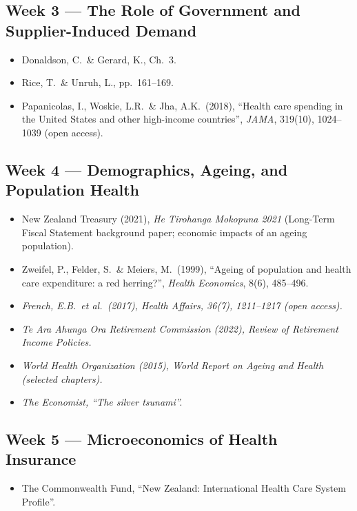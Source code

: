 \documentclass[11pt, a4paper]{article}
\begin{document}
\subsection{Week 3 — The Role of Government and Supplier-Induced Demand}
\begin{itemize}
  \item Donaldson, C.\ \& Gerard, K., Ch.~3.
  \item Rice, T.\ \& Unruh, L., pp.~161--169.
  \item Papanicolas, I., Woskie, L.R.\ \& Jha, A.K.\ (2018), ``Health care spending in the United States and other high-income countries'', \textit{JAMA}, 319(10), 1024--1039 (open access).
\end{itemize}

\subsection{Week 4 — Demographics, Ageing, and Population Health}
\begin{itemize}
  \item New Zealand Treasury (2021), \textit{He Tirohanga Mokopuna 2021} (Long-Term Fiscal Statement background paper; economic impacts of an ageing population).
  \item Zweifel, P., Felder, S.\ \& Meiers, M.\ (1999), ``Ageing of population and health care expenditure: a red herring?'', \textit{Health Economics}, 8(6), 485--496.
  \item \emph{French, E.B.\ et al.\ (2017), \textit{Health Affairs}, 36(7), 1211--1217 (open access).}
  \item \emph{Te Ara Ahunga Ora Retirement Commission (2022), \textit{Review of Retirement Income Policies}.}
  \item \emph{World Health Organization (2015), \textit{World Report on Ageing and Health} (selected chapters).}
  \item \emph{The Economist, ``The silver tsunami''.}
\end{itemize}

\subsection{Week 5 — Microeconomics of Health Insurance}
\begin{itemize}
  \item The Commonwealth Fund, ``New Zealand: International Health Care System Profile''.
\end{itemize}
\end{document}
